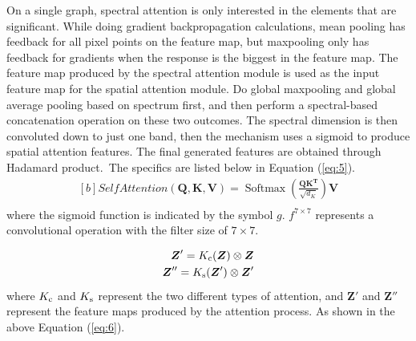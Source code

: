 \documentclass[]{interact}
\theoremstyle{plain}%
\theoremstyle{definition}
\theoremstyle{remark}
\begin{document}
 On a single graph, spectral attention is only interested in the elements that are significant. While doing gradient backpropagation calculations, mean pooling has feedback for all pixel points on the feature map, but maxpooling only has feedback for gradients when the response is the biggest in the feature map. The feature map produced by the spectral attention module \citep{woo2018cbam} is used as the input feature map for the spatial attention module. Do global maxpooling and global average pooling based on spectrum first, and then perform a spectral-based concatenation operation on these two outcomes. The spectral dimension is then convoluted down to just one band, then the mechanism uses a sigmoid to produce spatial attention features. The final generated features are obtained through Hadamard product. The specifics are listed below in Equation (\ref{eq:5}).
\begin{equation}\label{eq:5}
\begin{aligned}[b]
Self  Attention (\boldsymbol{Q}, \boldsymbol{K}, \boldsymbol{V})=\operatorname{Softmax}\left(\frac{\boldsymbol{Q} \boldsymbol{K}^{\boldsymbol{T}}}{\sqrt{d_K}}\right) \boldsymbol{V} \\
\end{aligned}
\end{equation}
where the sigmoid function is indicated by the symbol $g$. $f^{7 \times 7}$ represents a convolutional operation with the filter size of  $7 \times 7$.

\begin{equation}\label{eq:6}
\begin{aligned}[b]
{\boldsymbol Z'}= K_{\rm c}({\boldsymbol Z}) \otimes {\boldsymbol Z} \\
{\boldsymbol Z''}= K_{\rm s}({\boldsymbol Z'}) \otimes {\boldsymbol Z'}
\end{aligned}
\end{equation}
where $K_{\rm c}$ and $K_{\rm s}$ represent the two different types of attention, and ${\boldsymbol Z'}$ and ${\boldsymbol Z''}$ represent the feature maps produced by the attention process. As shown in the above Equation (\ref{eq:6}).
\end{document}
